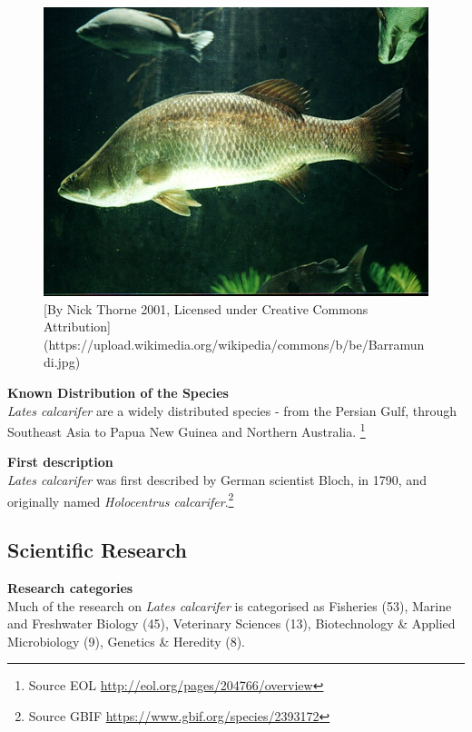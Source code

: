 \documentclass[]{book}
\theoremstyle{definition}
\theoremstyle{definition}
\theoremstyle{definition}
\theoremstyle{remark}
\begin{document}
\begin{figure}

{\centering \includegraphics[width=11.11in]{images_species/Barramundi} 

}

\caption{[By Nick Thorne 2001, Licensed under Creative Commons Attribution](https://upload.wikimedia.org/wikipedia/commons/b/be/Barramundi.jpg)}\label{fig:unnamed-chunk-3}
\end{figure}

\textbf{Known Distribution of the Species}\\
\emph{Lates calcarifer} are a widely distributed species - from the
Persian Gulf, through Southeast Asia to Papua New Guinea and Northern
Australia. \footnote{Source EOL
  \url{http://eol.org/pages/204766/overview}}

\textbf{First description}\\
\emph{Lates calcarifer} was first described by German scientist Bloch,
in 1790, and originally named \emph{Holocentrus calcarifer}.\footnote{Source
  GBIF \url{https://www.gbif.org/species/2393172}}

\hypertarget{scientific-research-1}{%
\subsection{Scientific Research}\label{scientific-research-1}}

\textbf{Research categories}\\
Much of the research on \emph{Lates calcarifer} is categorised as
Fisheries (53), Marine and Freshwater Biology (45), Veterinary Sciences
(13), Biotechnology \& Applied Microbiology (9), Genetics \& Heredity
(8).
\end{document}

